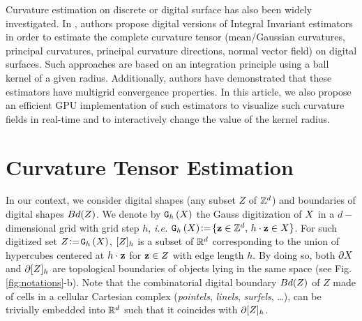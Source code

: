 \documentclass{llncs}
\begin{document}
Curvature estimation on discrete or digital surface has also been
widely investigated. In \cite{CVIU2014}, authors propose digital
versions of Integral Invariant estimators
\cite{Pottmann2007,Pottmann2009} in order to estimate the complete
curvature tensor (mean/Gaussian curvatures, principal curvatures,
principal curvature directions, normal vector field) on digital
surfaces. Such approaches are based on an integration principle using
a ball kernel of a given radius. Additionally, authors have
demonstrated that these estimators have multigrid convergence
properties. In this article, we also propose an efficient GPU
implementation of such estimators to visualize
such curvature fields in real-time and
to interactively change the
value of the kernel radius.




\section{Curvature Tensor Estimation}
\label{sec:curv-tens-estim}

\sloppy In our context, we consider digital shapes (any subset $Z$ of ${\mathbb{Z}}^d$)
and boundaries of digital shapes $Bd(Z)$. We denote by $\mathtt{G}_{h}\left(X\right)$ the
Gauss digitization of $X$ in a $d-$dimensional grid with grid step $h$,
\emph{i.e.}  $\mathtt{G}_{h}\left(X\right) \!\mathrel{\mathop:}=\! \{ \mathbf{z} \in {\mathbb{Z}}^d,\, h\cdot\mathbf{z}\in X\}$. For such
digitized set $Z\!\mathrel{\mathop:}=\!\mathtt{G}_{h}\left(X\right)$, $\lbrack Z \rbrack_{h}$ is a subset of ${\mathbb{R}}^d$
corresponding to the union of hypercubes centered at $h\cdot \mathbf{z}$ for $\mathbf{z}\in Z$
with edge length $h$. By doing so, both $\partial X$ and
$\partial\lbrack Z \rbrack_{h}$ are topological boundaries of objects lying in the same
space (see Fig. \ref{fig:notations}-b). Note that the combinatorial digital
boundary $Bd(Z)$ of $Z$ made of cells in a cellular Cartesian complex
(\emph{pointels}, \emph{linels}, \emph{surfels}, \ldots), can be trivially
embedded into ${\mathbb{R}}^d$ such that it coincides with $\partial\lbrack Z \rbrack_{h}$.
\end{document}
